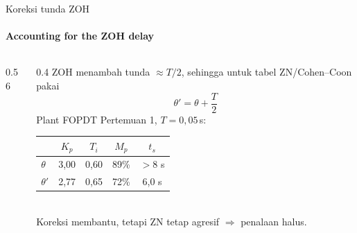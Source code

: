 \documentclass[aspectratio=169,10pt]{beamer}
\begin{document}
\begin{frame}{Koreksi tunda ZOH}
	\framesubtitle{Accounting for the ZOH delay}
	\begin{columns}[c]
		\begin{column}{0.56\textwidth}
			\centering
		\end{column}
		\begin{column}{0.4\textwidth}
			\small
			ZOH menambah tunda $\approx T/2$, sehingga untuk tabel ZN/Cohen--Coon pakai
			\[
				\theta' = \theta + \frac{T}{2}
			\]
			Plant FOPDT Pertemuan 1, $T=0{,}05$\,s:\\[2pt]
			\scriptsize
			\begin{tabular}{@{}l c c c c@{}}
				\toprule
				 & $K_p$ & $T_i$ & $M_p$ & $t_s$ \\
				\midrule
				$\theta$ & 3,00 & 0,60 & 89\% & $>8$ s \\
				$\theta'$ & 2,77 & 0,65 & 72\% & 6,0 s \\
				\bottomrule
			\end{tabular}\\[4pt]
			\small Koreksi membantu, tetapi ZN tetap agresif $\Rightarrow$ penalaan halus.
		\end{column}
	\end{columns}
\end{frame}
\end{document}
